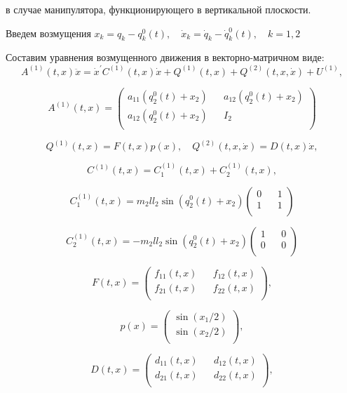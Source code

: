 в случае манипулятора, функционирующего в вертикальной плоскости.

Введем возмущения $x_k = q_k - q_k^0(t), \quad \dot x_k = \dot q_k - \dot q_k^0(t), \quad k = 1, 2$

Составим уравнения возмущенного движения в векторно-матричном виде:
\begin{equation}
A^{(1)}(t, x) \ddot x = {\dot x^{'} C^{(1)}(t, x) \dot x} + Q^{(1)}(t,x) + Q^{(2)}(t, x, \dot x) + U^{(1)}, \label{2chain_matrix}
\end{equation}

$$A^{(1)}(t, x) =
\begin{pmatrix}
a_{11} (q_2^0 (t) + x_2) && a_{12} (q_2^0 (t) + x_2) \\
a_{12} (q_2^0 (t) + x_2) && I_2 \\
\end{pmatrix}$$

$$Q^{(1)}(t,x)=F(t,x)p(x), \quad Q^{(2)}(t,x,\dot x)=D(t,x)\dot x,$$

$$C^{(1)}(t,x) = C_1^{(1)}(t, x) + C_2^{(1)}(t, x),$$

$$C_1^{(1)}(t, x) = m_2 l l_2 \sin (q_2^0 (t) + x_2)
\begin{pmatrix}
0 && 1\\
1 && 1\\
\end{pmatrix}$$

$$C_2^{(1)}(t, x) = - m_2 l l_2 \sin (q_2^0 (t) + x_2)
\begin{pmatrix}
1 && 0\\
0 && 0\\
\end{pmatrix}$$

$$F(t, x) =
\begin{pmatrix}
f_{11}(t,x) && f_{12}(t,x) \\
f_{21}(t,x) && f_{22}(t,x)\\
\end{pmatrix},$$

$$p(x) =
\begin{pmatrix}
\sin(x_1/2) \\
\sin(x_2/2)\\
\end{pmatrix},$$

$$D(t, x) =
\begin{pmatrix}
d_{11} (t, x) && d_{12} (t, x) \\
d_{21} (t, x) && d_{22} (t, x) \\
\end{pmatrix},$$

